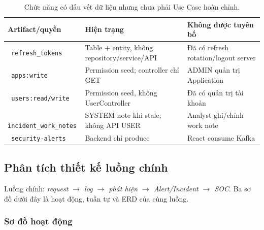 \documentclass[runningheads]{report-template/llncs}
\newcommand{\code}[1]{\texttt{\small\hyphenchar\font=45 #1}}
\begin{document}
\begin{table}
\caption{Chức năng có dấu vết dữ liệu nhưng chưa phải Use Case hoàn chỉnh.}
\label{tab:not-usecase}
\centering\small
\begin{tabularx}{\textwidth}{@{}p{32mm}YY@{}}
\toprule
Artifact/quyền & Hiện trạng & Không được tuyên bố\\
\midrule
\code{refresh\_tokens} & Table + entity, không repository/service/API &
Đã có refresh rotation/logout server\\
\code{apps:write} & Permission seed; controller chỉ GET &
ADMIN quản trị Application\\
\code{users:read/write} & Permission seed, không UserController &
Đã có quản trị tài khoản\\
\code{incident\_work\_notes} & SYSTEM note khi stale; không API USER &
Analyst ghi/chỉnh work note\\
\code{security-alerts} & Backend chỉ produce & React consume Kafka\\
\bottomrule
\end{tabularx}
\end{table}

\FloatBarrier
\clearpage
\subsection{Phân tích thiết kế luồng chính}

Luồng chính:
\emph{request $\rightarrow$ log $\rightarrow$ phát hiện $\rightarrow$
Alert/Incident $\rightarrow$ SOC}. Ba sơ đồ dưới đây là hoạt động, tuần
tự và ERD của cùng luồng.

\subsubsection{Sơ đồ hoạt động}
\end{document}
